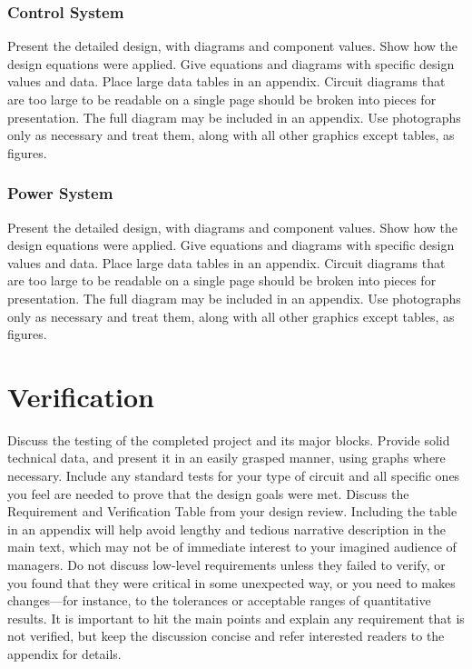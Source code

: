 \documentclass{report}
\begin{document}
    \subsection{Control System}
    Present the detailed design, with diagrams and component values. Show how the design equations were applied. Give equations and diagrams with specific design values and data. Place large data tables in an appendix. Circuit diagrams that are too large to be readable on a single page should be broken into pieces for presentation. The full diagram may be included in an appendix. Use photographs only as necessary and treat them, along with all other graphics except tables, as figures.  

    \subsection{Power System}
    Present the detailed design, with diagrams and component values. Show how the design equations were applied. Give equations and diagrams with specific design values and data. Place large data tables in an appendix. Circuit diagrams that are too large to be readable on a single page should be broken into pieces for presentation. The full diagram may be included in an appendix. Use photographs only as necessary and treat them, along with all other graphics except tables, as figures.

    \chapter{Verification}

    Discuss the testing of the completed project and its major blocks. Provide solid technical data, and present it in an easily grasped manner, using graphs where necessary. Include any standard tests for your type of circuit and all specific ones you feel are needed to prove that the design goals were met. Discuss the Requirement and Verification Table from your design review. Including the table in an appendix will help avoid lengthy and tedious narrative description in the main text, which may not be of immediate interest to your imagined audience of managers. Do not discuss low-level requirements unless they failed to verify, or you found that they were critical in some unexpected way, or you need to makes changes—for instance, to the tolerances or acceptable ranges of quantitative results. It is important to hit the main points and explain any requirement that is not verified, but keep the discussion concise and refer interested readers to the appendix for details.
\end{document}
